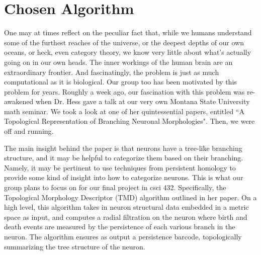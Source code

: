 \documentclass[11pt]{article}
\begin{document}
\maketitle
\section*{Chosen Algorithm}
One may at times reflect on the peculiar fact that, while we humans understand some of the furthest reaches of the universe,
or the deepest depths of our own oceans, or heck, even category theory, we know very little about what's actually going on in our own heads.
The inner workings of the human brain are an extraordinary frontier. And fascinatingly, the problem is just as much computational
 as it is biological. Our group too has been motivated by this problem for years. Roughly a week ago, our fascination with this problem
 was re-awakened when Dr. Hess gave a talk at our very own Montana State University math seminar. We took a look at one of her quintessential papers,
 entitled ``A Topological Representation of Branching Neuronal Morphologies". Then, we were off and running. 
 
 The main insight behind the paper is that neurons have a tree-like branching structure, and it may be helpful to categorize them based on their branching.
 Namely, it may be pertinent to use techniques from persistent homology to provide some kind of insight into how to categorize neurons. This is what our group
 plans to focus on for our final project in csci 432. Specifically, the Topological Morphology Descriptor (TMD) algorithm outlined in her paper. On a high level, this algorithm
 takes in neuron structural data embedded in a metric space as input, and computes a radial filtration on the neuron where birth and death events are measured by the persistence of each
 various branch in the neuron. The algorithm ensures as output a persistence barcode, topologically summarizing the tree structure of the neuron. 
\end{document}
